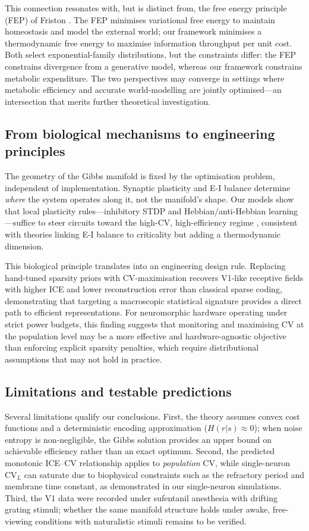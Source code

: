 This connection resonates with, but is distinct from, the free energy principle (FEP) of Friston \cite{Friston2006}.  The FEP minimises variational free energy to maintain homeostasis and model the external world; our framework minimises a thermodynamic free energy to maximise information throughput per unit cost.  Both select exponential-family distributions, but the constraints differ: the FEP constrains divergence from a generative model, whereas our framework constrains metabolic expenditure.  The two perspectives may converge in settings where metabolic efficiency and accurate world-modelling are jointly optimised---an intersection that merits further theoretical investigation.

\subsection{From biological mechanisms to engineering principles}

The geometry of the Gibbs manifold is fixed by the optimisation problem, independent of implementation.  Synaptic plasticity and E-I balance determine \emph{where} the system operates along it, not the manifold's shape.  Our models show that local plasticity rules---inhibitory STDP and Hebbian/anti-Hebbian learning---suffice to steer circuits toward the high-CV, high-efficiency regime \cite{43}, consistent with theories linking E-I balance to criticality \cite{Liang2025prl} but adding a thermodynamic dimension.

This biological principle translates into an engineering design rule.  Replacing hand-tuned sparsity priors with CV-maximisation recovers V1-like receptive fields with higher ICE and lower reconstruction error than classical sparse coding, demonstrating that targeting a macroscopic statistical signature provides a direct path to efficient representations.  For neuromorphic hardware operating under strict power budgets, this finding suggests that monitoring and maximising CV at the population level may be a more effective and hardware-agnostic objective than enforcing explicit sparsity penalties, which require distributional assumptions that may not hold in practice.

\subsection{Limitations and testable predictions}

Several limitations qualify our conclusions.  First, the theory assumes convex cost functions and a deterministic encoding approximation ($H(r|s)\approx 0$); when noise entropy is non-negligible, the Gibbs solution provides an upper bound on achievable efficiency rather than an exact optimum.  Second, the predicted monotonic ICE--CV relationship applies to \emph{population} CV, while single-neuron $\mathrm{CV}_L$ can saturate due to biophysical constraints such as the refractory period and membrane time constant, as demonstrated in our single-neuron simulations.  Third, the V1 data were recorded under sufentanil anesthesia with drifting grating stimuli; whether the same manifold structure holds under awake, free-viewing conditions with naturalistic stimuli remains to be verified.

